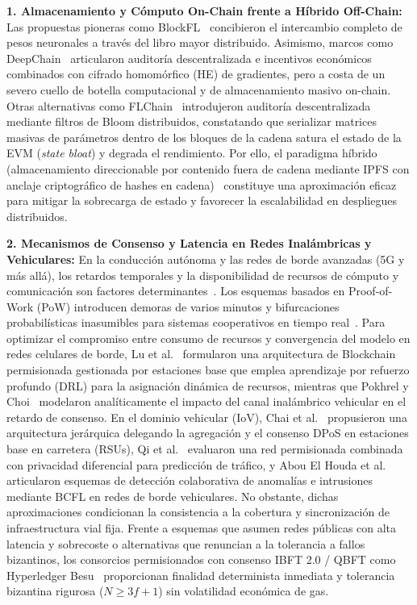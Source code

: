 \textbf{1. Almacenamiento y Cómputo On-Chain frente a Híbrido Off-Chain:} Las propuestas pioneras como BlockFL~\cite{kim2019blockfl} concibieron el intercambio completo de pesos neuronales a través del libro mayor distribuido. Asimismo, marcos como DeepChain~\cite{weng2021deepchain} articularon auditoría descentralizada e incentivos económicos combinados con cifrado homomórfico (HE) de gradientes, pero a costa de un severo cuello de botella computacional y de almacenamiento masivo on-chain. Otras alternativas como FLChain~\cite{bao2019flchain} introdujeron auditoría descentralizada mediante filtros de Bloom distribuidos, constatando que serializar matrices masivas de parámetros dentro de los bloques de la cadena satura el estado de la EVM (\textit{state bloat}) y degrada el rendimiento. Por ello, el paradigma híbrido (almacenamiento direccionable por contenido fuera de cadena mediante IPFS con anclaje criptográfico de hashes en cadena)~\cite{zhao2021privacy, goh2023blockchain} constituye una aproximación eficaz para mitigar la sobrecarga de estado y favorecer la escalabilidad en despliegues distribuidos.

\textbf{2. Mecanismos de Consenso y Latencia en Redes Inalámbricas y Vehiculares:} En la conducción autónoma y las redes de borde avanzadas (5G y más allá), los retardos temporales y la disponibilidad de recursos de cómputo y comunicación son factores determinantes~\cite{pokhrel2020federated, lu2020blockchain}. Los esquemas basados en Proof-of-Work (PoW) introducen demoras de varios minutos y bifurcaciones probabilísticas inasumibles para sistemas cooperativos en tiempo real~\cite{kim2019blockfl}. Para optimizar el compromiso entre consumo de recursos y convergencia del modelo en redes celulares de borde, Lu et al.~\cite{lu2020blockchain} formularon una arquitectura de Blockchain permisionada gestionada por estaciones base que emplea aprendizaje por refuerzo profundo (DRL) para la asignación dinámica de recursos, mientras que Pokhrel y Choi~\cite{pokhrel2020federated} modelaron analíticamente el impacto del canal inalámbrico vehicular en el retardo de consenso. En el dominio vehicular (IoV), Chai et al.~\cite{chai2021hierarchical} propusieron una arquitectura jerárquica delegando la agregación y el consenso DPoS en estaciones base en carretera (RSUs), Qi et al.~\cite{qi2021privacy} evaluaron una red permisionada combinada con privacidad diferencial para predicción de tráfico, y Abou El Houda et al.~\cite{abouelhouda2024blockchain} articularon esquemas de detección colaborativa de anomalías e intrusiones mediante BCFL en redes de borde vehiculares. No obstante, dichas aproximaciones condicionan la consistencia a la cobertura y sincronización de infraestructura vial fija. Frente a esquemas que asumen redes públicas con alta latencia y sobrecoste o alternativas que renuncian a la tolerancia a fallos bizantinos, los consorcios permisionados con consenso IBFT 2.0 / QBFT como Hyperledger Besu~\cite{pujol2024blockchain} proporcionan finalidad determinista inmediata y tolerancia bizantina rigurosa ($N \ge 3f + 1$) sin volatilidad económica de gas.

